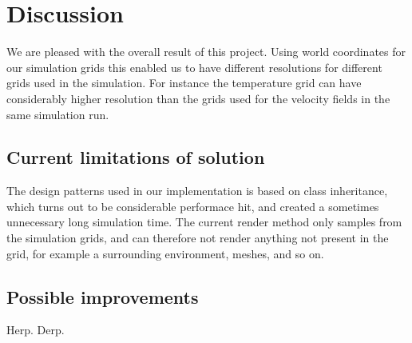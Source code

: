 \section{Discussion}
We are pleased with the overall result of this project. Using world coordinates for our simulation grids this enabled us to have different resolutions for different grids used in the simulation. For instance the temperature grid can have considerably higher resolution than the grids used for the velocity fields in the same simulation run.
\subsection{Current limitations of solution}
The design patterns used in our implementation is based on class inheritance, which turns out to be considerable performace hit, and created a sometimes unnecessary long simulation time. The current render method only samples from the simulation grids, and can therefore not render anything not present in the grid, for example a surrounding environment, meshes, and so on.
\subsection{Possible improvements}
Herp. Derp.